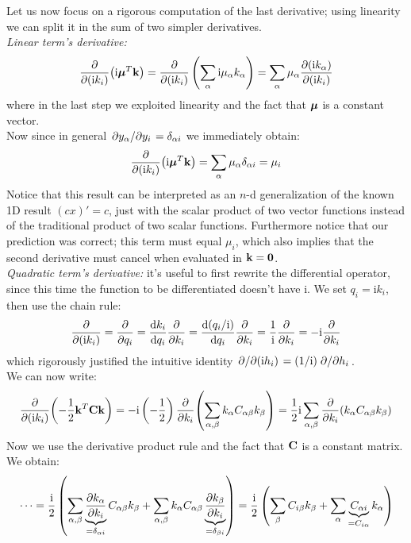 \documentclass[a4paper]{article}
\newcommand{\mat}[1]{\vb{#1}}
\renewcommand{\i}{\mathrm{i}} %
\begin{document}
Let us now focus on a rigorous computation of the last derivative; using linearity we can split it in the sum of two simpler derivatives.\\
\emph{Linear term's derivative:}
\begin{equation*}
    \pdv{(\i k_i)}(\i \vb*{\mu}^T\vb{k}) = \pdv{(\i k_i)}\left(\sum_\alpha \i \mu_\alpha k_\alpha \right) = \sum_\alpha \mu_\alpha \pdv{(\i k_\alpha)}{(\i k_i)}
\end{equation*}
where in the last step we exploited linearity and the fact that $\vb*{\mu}$ is a constant vector.\\
Now since in general $\pdv*{y_\alpha}{y_i} = \delta_{\alpha i}$ we immediately obtain:
\begin{equation*}
    \pdv{(\i k_i)}(\i \vb*{\mu}^T \vb{k}) = \sum_\alpha \mu_\alpha \delta_{\alpha i} = \mu_i
\end{equation*}
Notice that this result can be interpreted as an $n$-d generalization of the known 1D result $(cx)' = c$, just with the scalar product of two vector functions instead of the traditional product of two scalar functions. Furthermore notice that our prediction was correct; this term must equal $\mu_i$, which also implies that the second derivative must cancel when evaluated in $\vb{k} = \vb{0}$.\\
\emph{Quadratic term's derivative:} it's useful to first rewrite the differential operator, since this time the function to be differentiated doesn't have $\i$. We set $q_i = \i k_i$, then use the chain rule:
\begin{equation*}
    \pdv{(\i k_i)} = \pdv{q_i} = \dv{k_i}{q_i}\pdv{k_i} = \dv{(q_i/\i)}{q_i}\pdv{k_i} = \frac{1}{\i}\pdv{k_i} = -\i \pdv{k_i}
\end{equation*}
which rigorously justified the intuitive identity $\pdv*{(\i h_i)} = (1/\i) \pdv*{h_i}$.\\
We can now write:
\begin{equation*}
    \pdv{(\i k_i)}(-\frac{1}{2}\vb{k}^T\mat{C}\vb{k}) =
    -\i \left(-\frac{1}{2}\right) \pdv{k_i}(\sum_{\alpha,\beta} k_\alpha C_{\alpha\beta} k_\beta) = 
    \frac{1}{2}\i \sum_{\alpha,\beta} \pdv{k_i}(k_\alpha C_{\alpha\beta} k_\beta)
\end{equation*}
Now we use the derivative product rule and the fact that $\mat{C}$ is a constant matrix. We obtain:
\begin{equation*}
    \dots = \frac{\i}{2} \left(\sum_{\alpha,\beta} \underbrace{\pdv{k_\alpha}{k_i}}_{= \delta_{\alpha i}}C_{\alpha\beta} k_\beta +
    \sum_{\alpha,\beta} k_\alpha C_{\alpha\beta}\underbrace{\pdv{k_\beta}{k_i}}_{=\delta_{\beta i}}
    \right) = 
    \frac{\i}{2} \left(
    \sum_\beta C_{i\beta}k_\beta + \sum_\alpha \underbrace{C_{\alpha i}}_{= C_{i \alpha}} k_\alpha
    \right)
\end{equation*}
\end{document}
